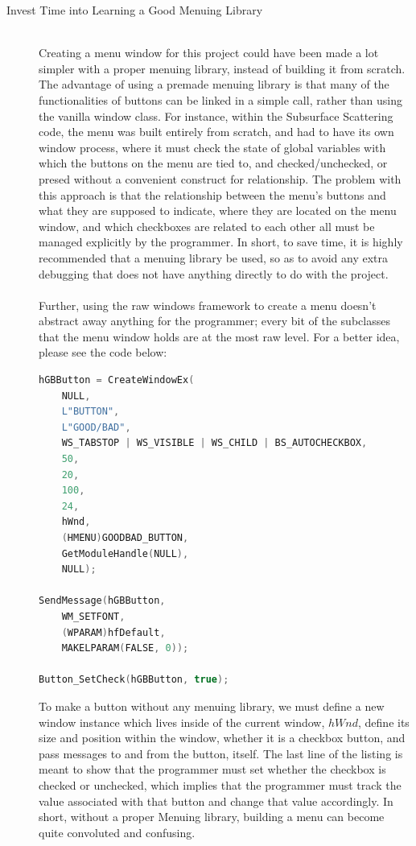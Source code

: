 \documentclass[a4paper, 12pt]{article}
\begin{document}
\begin{description}
\item[Invest Time into Learning a Good Menuing Library] \hfill \\

Creating a menu window for this project could have been made a lot simpler
with a proper menuing library, instead of building it from scratch. The
advantage of using a premade menuing library is that many of the
functionalities of buttons can be linked in a simple call, rather than using
the vanilla window class. For instance, within the Subsurface Scattering code,
the menu was built entirely from scratch, and had to have its own window
process, where it must check the state of global variables with which the
buttons on the menu are tied to, and checked/unchecked, or presed without a
convenient construct for relationship. The problem with this approach is that
the relationship between the menu's buttons and what they are supposed to
indicate, where they are located on the menu window, and which checkboxes are
related to each other all must be managed explicitly by the programmer. In
short, to save time, it is highly recommended that a menuing library be used,
so as to avoid any extra debugging that does not have anything directly to do
with the project.  \\ \\ Further, using the raw windows framework to create a
menu doesn't abstract away anything for the programmer; every bit of the
subclasses that the menu window holds are at the most raw level. For a better idea, please see the code below:

\begin{lstlisting}[language=C++, numbers=none, frame=none]
hGBButton = CreateWindowEx(
	NULL,
	L"BUTTON",
	L"GOOD/BAD",
	WS_TABSTOP | WS_VISIBLE | WS_CHILD | BS_AUTOCHECKBOX,
	50,
	20,
	100,
	24,
	hWnd,
	(HMENU)GOODBAD_BUTTON,
	GetModuleHandle(NULL),
	NULL);

SendMessage(hGBButton,
	WM_SETFONT,
	(WPARAM)hfDefault,
	MAKELPARAM(FALSE, 0));

Button_SetCheck(hGBButton, true);
\end{lstlisting}

To make a button without any menuing library, we must define a new window
instance which lives inside of the current window, $hWnd$, define its size and
position within the window, whether it is a checkbox button, and pass messages
to and from the button, itself. The last line of the listing is meant to show
that the programmer must set whether the checkbox is checked or unchecked,
which implies that the programmer must track the value associated with that
button and change that value accordingly. In short, without a proper Menuing
library, building a menu can become quite convoluted and confusing.


\end{description}
\end{document}
